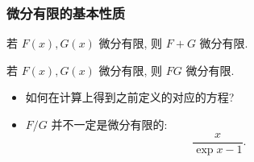 \documentclass{ctexbeamer}
\newcommand{\bbF}{\mathbb F}
\newcommand{\bbZ}{\mathbb Z}
\begin{document}
\begin{frame}
  \frametitle{微分有限的基本性质}

  \begin{theorem}
    若 $F(x), G(x)$ 微分有限, 则 $F+G$ 微分有限.
  \end{theorem}
  \begin{theorem}
    若 $F(x), G(x)$ 微分有限, 则 $FG$ 微分有限.
  \end{theorem}
  \begin{itemize}
    \item 如何在计算上得到之前定义的对应的方程?
    \pause
    \item $F/G$ 并不一定是微分有限的:
    \begin{equation}
      \frac{x}{\exp x - 1}.
    \end{equation}
  \end{itemize}

\end{frame}




    


\end{document}
